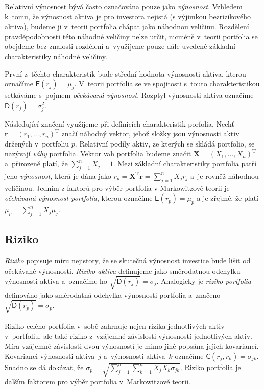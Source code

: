 \documentclass[a4paper,12pt]{report}
\theoremstyle{definition} \newtheorem{definice}[veta]{Definice}
\theoremstyle{remark}
\begin{document}
Relativní výnosnost bývá často označována pouze jako \textit{výnosnost}.
Vzhledem k~tomu, že výnosnost aktiva je pro investora nejistá (s výjimkou bezrizikového aktiva), budeme ji v~teorii portfolia chápat jako náhodnou veličinu. %
Rozdělení pravděpodobnosti této náhodné veličiny nelze určit, nicméně v~teorii portfolia se obejdeme bez znalosti rozdělení a~využijeme pouze dále uvedené základní charakteristiky náhodné veličiny.

První z~těchto charakteristik bude střední hodnota výnosnosti aktiva, kterou označíme $\mathsf{E}(r_j)=\mu_j$.
V~teorii portfolia se ve spojitosti s~touto charakteristikou setkáváme s~pojmem \textit{očekávaná výnosnost}.
Rozptyl výnosnosti aktiva označíme $\mathsf{D}(r_j)=\sigma_j^2$.

Následující značení využijeme při definicích charakteristik porfolia.
Nechť $\boldsymbol{r}=(r_1,\dots,r_n)^\mathrm{T}$ značí náhodný vektor, jehož složky jsou výnosnosti aktiv držených v~portfoliu $p$.
Relativní podíly aktiv, ze kterých se skládá portfolio, se nazývají \textit{váhy} portfolia.
Vektor vah portfolia budeme značit $\boldsymbol{X}=(X_1,\dots,X_n)^\mathrm{T}$ a~přirozeně platí, že $\sum_{j=1}^nX_j=1$. 
Mezi základní charakteristiky portfolia patří jeho \textit{výnosnost}, která je dána jako $r_p=\boldsymbol{X}^\mathrm{T}\boldsymbol{r}=\sum_{j=1}^nX_jr_j$ a~je rovněž náhodnou veličinou.   
Jedním z faktorů pro výběr portfolia v Markowitzově teorii je \textit{očekávaná výnosnost portfolia}, kterou označíme $\mathsf{E}(r_p)=\mu_p$ a je zřejmé, že platí $\mu_p=\sum_{j=1}^nX_j\mu_j$.

\subsection{Riziko}
\textit{Riziko} popisuje míru nejistoty, že se skutečná výnosnost investice bude lišit od očekávané výnosnosti.  
\textit{Riziko aktiva} definujeme jako směrodatnou odchylku výnosnosti aktiva a~označíme ho $\sqrt{\mathsf{D}(r_j)}=\sigma_j$.
Analogicky je \textit{riziko portfolia} definováno jako směrodatná odchylka výnosnosti portfolia a~značeno $\sqrt{\mathsf{D}(r_p)}=\sigma_p$.  

Riziko celého portfolia v~sobě zahrnuje nejen rizika jednotlivých aktiv v~portfoliu, ale také riziko z~vzájemné závislosti výnosností jednotlivých aktiv.
Míra vzájemné závislosti dvou výnosností je mimo jiné popsána jejich kovariancí. 
Kovarianci výnosnosti aktiva~$j$ a~výnosnosti aktiva~$k$ označíme $\mathsf{C}(r_j,r_k)=\sigma_{jk}$.
Snadno se dá dokázat, že $\sigma_p=\sqrt{\sum_{j=1}^n\sum_{k=1}^nX_jX_k\sigma_{jk}}$.
Riziko portfolia je dalším faktorem pro výběr portfolia v~Markowitzově teorii.  
\end{document}

